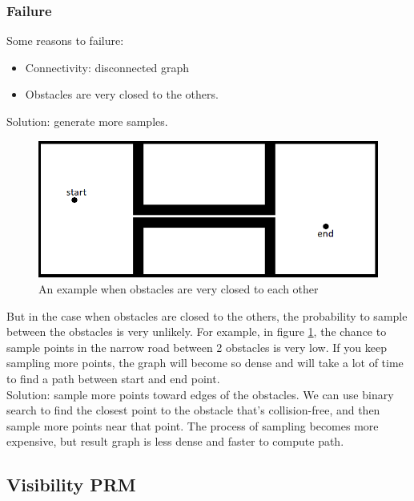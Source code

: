 \documentclass[11pt]{article}
\begin{document}
\subsubsection{Failure}
Some reasons to failure:
\begin{itemize}
\item Connectivity: disconnected graph
\item Obstacles are very closed to the others. 
\end{itemize}
Solution: generate more samples.\\

\begin{figure}
\includegraphics{closed_obs}
\centering
\caption{An example when obstacles are very closed to each other}
\label{fig:closed_obs}
\end{figure}

But in the case when obstacles are closed to the others, the probability to sample between the obstacles is very unlikely. For example, in figure \ref{fig:closed_obs}, the chance to sample points in the narrow road between 2 obstacles is very low. If you keep sampling more points, the graph will become so dense and will take a lot of time to find a path between start and end point.\\
Solution: sample more points toward edges of the obstacles. We can use binary search to find the closest point to the obstacle that's collision-free, and then sample more points near that point. The process of sampling becomes more expensive, but result graph is less dense and faster to compute path.

\subsection{Visibility PRM}
\end{document}
